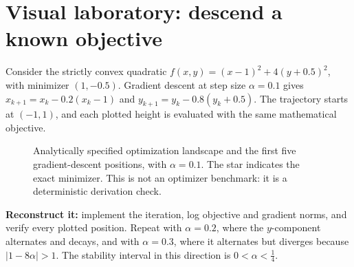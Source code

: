 \clearpage
\section*{Visual laboratory: descend a known objective}
\noindent Consider the strictly convex quadratic
\(f(x,y)=(x-1)^2+4(y+0.5)^2\), with minimizer
\((1,-0.5)\). Gradient descent at step size \(\alpha=0.1\) gives
\(x_{k+1}=x_k-0.2(x_k-1)\) and
\(y_{k+1}=y_k-0.8(y_k+0.5)\).
The trajectory starts at \((-1,1)\), and each plotted height is evaluated
with the same mathematical objective.
\begin{figure}[!htbp]
\centering
{}
\caption{Analytically specified optimization landscape and the first five
gradient-descent positions, with \(\alpha=0.1\). The star indicates the exact
minimizer. This is not an optimizer benchmark: it is a deterministic
derivation check.}
\label{fig:book02-optimization-landscape}
\end{figure}
\noindent\textbf{Reconstruct it:} implement the iteration, log objective
and gradient norms, and verify every plotted position. Repeat with
\(\alpha=0.2\), where the \(y\)-component alternates and decays, and
with \(\alpha=0.3\), where it alternates but diverges because
\(\lvert 1-8\alpha\rvert>1\). The stability interval in this direction
is \(0<\alpha<\tfrac14\).
